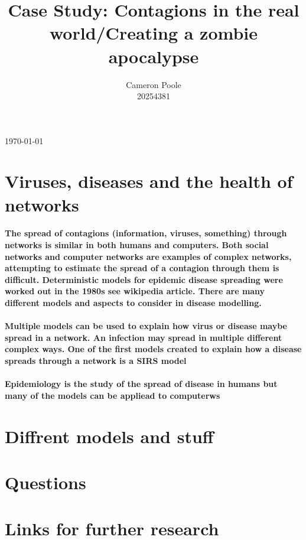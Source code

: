 \documentclass{article}
\begin{document}
\title{Case Study: Contagions in the real world/Creating a zombie apocalypse}
\author{Cameron Poole\\
	20254381}
\today
\maketitle

\section{Viruses, diseases and the health of networks}
\paragraph{
The spread of contagions (information, viruses, something) through networks is similar in both humans and computers.
Both social networks and computer networks are examples of complex networks, attempting to estimate the spread of a contagion through them is difficult. 
Deterministic models for epidemic disease spreading were worked out in the 1980s see wikipedia article.
There are many different models and aspects to consider in disease modelling. }

\paragraph{
Multiple models can be used to explain how virus or disease maybe spread in a network. 
An infection may spread in multiple different complex ways. One of the first models created to explain how a disease spreads through a network is a 
SIRS model}

\paragraph{Epidemiology is the study of the spread of disease in humans but many of the models can be appliead to computerws}

\section{Diffrent models and stuff}
\section{Questions}
\section{Links for further research}
\end{document}
